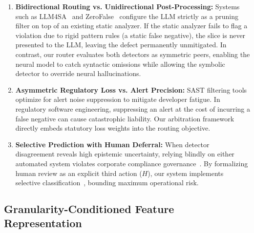 \begin{enumerate}
    \item \textbf{Bidirectional Routing vs. Unidirectional Post-Processing:} Systems such as LLM4SA~\cite{wen2024automatically} and ZeroFalse~\cite{iranmanesh2025zerofalse} configure the LLM strictly as a pruning filter on top of an existing static analyzer. If the static analyzer fails to flag a violation due to rigid pattern rules (a static false negative), the slice is never presented to the LLM, leaving the defect permanently unmitigated. In contrast, our router evaluates both detectors as symmetric peers, enabling the neural model to catch syntactic omissions while allowing the symbolic detector to override neural hallucinations.
    \item \textbf{Asymmetric Regulatory Loss vs. Alert Precision:} SAST filtering tools optimize for alert noise suppression to mitigate developer fatigue. In regulatory software engineering, suppressing an alert at the cost of incurring a false negative can cause catastrophic liability. Our arbitration framework directly embeds statutory loss weights into the routing objective.
    \item \textbf{Selective Prediction with Human Deferral:} When detector disagreement reveals high epistemic uncertainty, relying blindly on either automated system violates corporate compliance governance~\cite{paramasivan2024acs}. By formalizing human review as an explicit third action ($H$), our system implements selective classification~\cite{chow1970optimum,madras2018predict,mozannar2020consistent}, bounding maximum operational risk.
\end{enumerate}

\subsection{Granularity-Conditioned Feature Representation}
\label{sec:methodology:features}

